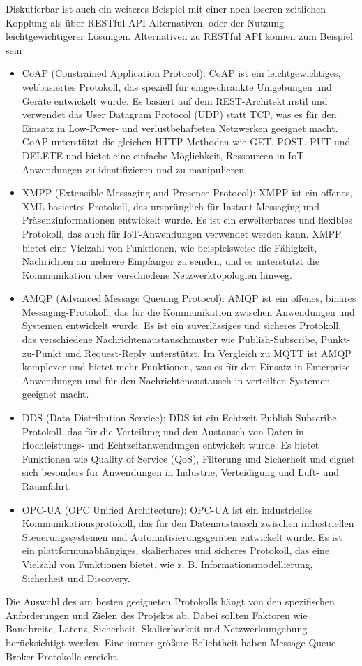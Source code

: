 Diskutierbar ist auch ein weiteres Beispiel mit einer noch loseren zeitlichen Kopplung als über RESTful API Alternativen, oder der Nutzung leichtgewichtigerer Lösungen.
Alternativen zu RESTful API können zum Beispiel sein
\begin{itemize}
\item CoAP (Constrained Application Protocol): CoAP ist ein leichtgewichtiges, webbasiertes Protokoll, das speziell für eingeschränkte Umgebungen und Geräte entwickelt wurde. Es basiert auf dem REST-Architekturstil und verwendet das User Datagram Protocol (UDP) statt TCP, was es für den Einsatz in Low-Power- und verlustbehafteten Netzwerken geeignet macht. CoAP unterstützt die gleichen HTTP-Methoden wie GET, POST, PUT und DELETE und bietet eine einfache Möglichkeit, Ressourcen in IoT-Anwendungen zu identifizieren und zu manipulieren.
\item XMPP (Extensible Messaging and Presence Protocol): XMPP ist ein offenes, XML-basiertes Protokoll, das ursprünglich für Instant Messaging und Präsenzinformationen entwickelt wurde. Es ist ein erweiterbares und flexibles Protokoll, das auch für IoT-Anwendungen verwendet werden kann. XMPP bietet eine Vielzahl von Funktionen, wie beispielsweise die Fähigkeit, Nachrichten an mehrere Empfänger zu senden, und es unterstützt die Kommunikation über verschiedene Netzwerktopologien hinweg.
\item AMQP (Advanced Message Queuing Protocol): AMQP ist ein offenes, binäres Messaging-Protokoll, das für die Kommunikation zwischen Anwendungen und Systemen entwickelt wurde. Es ist ein zuverlässiges und sicheres Protokoll, das verschiedene Nachrichtenaustauschmuster wie Publish-Subscribe, Punkt-zu-Punkt und Request-Reply unterstützt. Im Vergleich zu MQTT ist AMQP komplexer und bietet mehr Funktionen, was es für den Einsatz in Enterprise-Anwendungen und für den Nachrichtenaustausch in verteilten Systemen geeignet macht.
\item DDS (Data Distribution Service): DDS ist ein Echtzeit-Publish-Subscribe-Protokoll, das für die Verteilung und den Austausch von Daten in Hochleistungs- und Echtzeitanwendungen entwickelt wurde. Es bietet Funktionen wie Quality of Service (QoS), Filterung und Sicherheit und eignet sich besonders für Anwendungen in Industrie, Verteidigung und Luft- und Raumfahrt.
\item OPC-UA (OPC Unified Architecture): OPC-UA ist ein industrielles Kommunikationsprotokoll, das für den Datenaustausch zwischen industriellen Steuerungssystemen und Automatisierungsgeräten entwickelt wurde. Es ist ein plattformunabhängiges, skalierbares und sicheres Protokoll, das eine Vielzahl von Funktionen bietet, wie z. B. Informationsmodellierung, Sicherheit und Discovery.
\end{itemize}
Die Auswahl des am besten geeigneten Protokolls hängt von den spezifischen Anforderungen und Zielen des Projekts ab. Dabei sollten Faktoren wie Bandbreite, Latenz, Sicherheit, Skalierbarkeit und Netzwerkumgebung berücksichtigt werden. Eine immer größere Beliebtheit haben Message Queue Broker Protokolle erreicht.  

